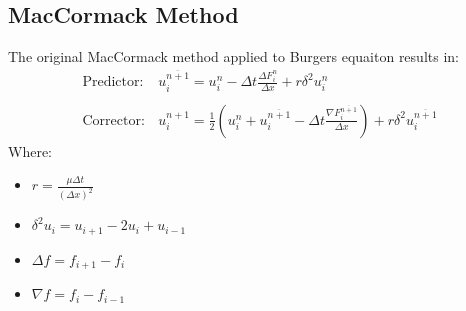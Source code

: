\documentclass[11pt, a4paper]{article}
\begin{document}
\subsection{MacCormack Method}
The original MacCormack method applied to Burgers equaiton results in:
\begin{equation}
    \begin{array}{cc}
        \displaystyle\mathrm{Predictor:} & \displaystyle u_i^{\overline{n+1}}=u_i^n-\Delta t\frac{\Delta F_i^n}{\Delta x}+r\delta^2u_i^n \\\\ 
        \displaystyle\mathrm{Corrector:} & \displaystyle u_i^{n+1}=\frac{1}{2}\left(u_i^n+u_i^{\overline{n+1}}-\Delta t\frac{\nabla F_i^{\overline{n+1}}}{\Delta x}\right)+r\delta^2u_i^{\overline{n+1}}
    \end{array}
\end{equation}
Where:
\begin{itemize}
    \item $\displaystyle r=\frac{\mu\Delta t}{\left(\Delta x\right)^2}$
    \item $\displaystyle \delta^2u_i=u_{i+1}-2u_i+u_{i-1}$
    \item $\Delta f=f_{i+1}-f_i$
    \item $\nabla f=f_i-f_{i-1}$
\end{itemize}

\end{document}
